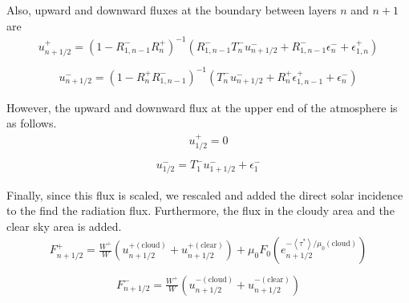 Also, upward and downward fluxes at the boundary between layers \(n\)
and \(n+1\) are \begin{equation}
\begin{array}{l}
u_{n+1 / 2}^{+}=\left(1-R_{1, n-1}^{-} R_{n}^{+}\right)^{-1}\left(R_{1, n-1}^{-} T_{n}^{-} u_{n+1 / 2}^{-}+R_{1, n-1}^{-} \epsilon_{n}^{-}+\epsilon_{1, n}^{+}\right) \\
\end{array}
\end{equation} \begin{equation}
\begin{array}{l}
u_{n+1 / 2}^{-}=\left(1-R_{n}^{+} R_{1, n-1}^{-}\right)^{-1}\left(T_{n}^{-} u_{n+1 / 2}^{-}+R_{n}^{+} \epsilon_{1, n-1}^{+}+\epsilon_{n}^{-}\right)
\end{array}
\end{equation}

However, the upward and downward flux at the upper end of the atmosphere
is as follows. \begin{equation}
\begin{array}{l}
u_{1 / 2}^{+}=0 \\
\end{array}
\end{equation} \begin{equation}
\begin{array}{l}
u_{1 / 2}^{-}=T_{1}^{-} u_{1+1 / 2}^{-}+\epsilon_{1}^{-}
\end{array}
\end{equation}

Finally, since this flux is scaled, we rescaled and added the direct
solar incidence to the find the radiation flux. Furthermore, the flux in
the cloudy area and the clear sky area is added. \begin{equation}
\begin{array}{c}
F_{n+1 / 2}^{+}=\frac{W^{+}}{W}\left(u_{n+1 / 2}^{+(\text{cloud})}+u_{n+1 / 2}^{+(\text{clear})}\right)+\mu_{0} F_{0}\left(e_{n+1 / 2}^{-\left\langle\tau^{*}\right\rangle / \mu_{0}(\text {cloud})}\right) \\
\end{array}
\end{equation} \begin{equation}
\begin{array}{c}
F_{n+1 / 2}^{-}=\frac{W^{+}}{W}\left(u_{n+1 / 2}^{-(\text{cloud})}+u_{n+1 / 2}^{-(\text {clear})}\right)
\end{array}
\end{equation}

